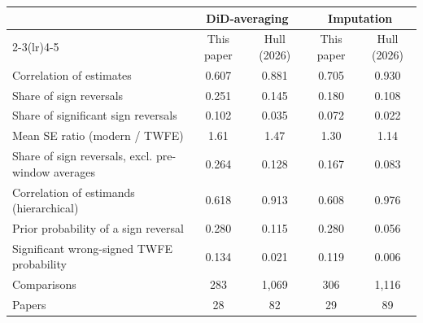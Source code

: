 \begin{tabular}{lcccc}
\toprule
 & \multicolumn{2}{c}{DiD-averaging} & \multicolumn{2}{c}{Imputation} \\
\cmidrule(lr){2-3}\cmidrule(lr){4-5}
 & This paper & Hull (2026) & This paper & Hull (2026) \\
\midrule
Correlation of estimates & 0.607 & 0.881 & 0.705 & 0.930 \\
Share of sign reversals & 0.251 & 0.145 & 0.180 & 0.108 \\
Share of significant sign reversals & 0.102 & 0.035 & 0.072 & 0.022 \\
Mean SE ratio (modern / TWFE) & 1.61 & 1.47 & 1.30 & 1.14 \\
Share of sign reversals, excl. pre-window averages & 0.264 & 0.128 & 0.167 & 0.083 \\
Correlation of estimands (hierarchical) & 0.618 & 0.913 & 0.608 & 0.976 \\
Prior probability of a sign reversal & 0.280 & 0.115 & 0.280 & 0.056 \\
Significant wrong-signed TWFE probability & 0.134 & 0.021 & 0.119 & 0.006 \\
\midrule
Comparisons & 283 & 1,069 & 306 & 1,116 \\
Papers & 28 & 82 & 29 & 89 \\
\bottomrule
\end{tabular}
